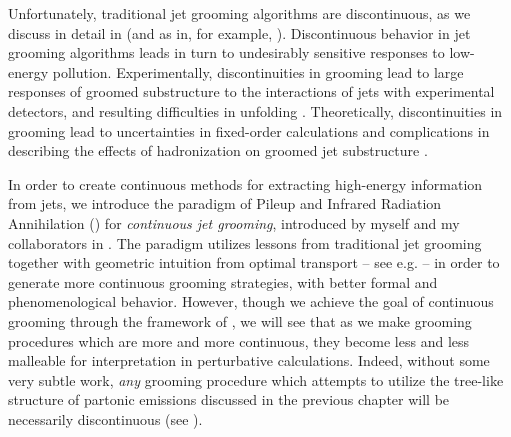 Unfortunately, traditional jet grooming algorithms are discontinuous, as we discuss in detail in  (and as in, for example, ).
%
Discontinuous behavior in jet grooming algorithms leads in turn to undesirably sensitive responses to low-energy pollution.
%
Experimentally, discontinuities in grooming lead to large responses of groomed substructure to the interactions of jets with experimental detectors, and resulting difficulties in unfolding \cite{ATL-PHYS-PUB-2019-027,Aad:2019vyi,ATLAS:2020gwe}.
%
Theoretically, discontinuities in grooming lead to uncertainties in fixed-order calculations \cite{Larkoski:2014wba} and complications in describing the effects of \gls{hadronization} on groomed jet substructure \cite{Hoang:2019ceu}.


In order to create continuous methods for extracting high-energy information from jets, we introduce the paradigm of Pileup and Infrared Radiation Annihilation (\PIRANHA{}) for \emph{continuous jet grooming}, introduced by myself and my collaborators in .
%
The \PIRANHA{} paradigm utilizes lessons from traditional jet grooming together with geometric intuition from optimal transport -- see e.g.  -- in order to generate more continuous grooming strategies, with better formal and phenomenological behavior.
%
However, though we achieve the goal of continuous grooming through the framework of \PIRANHA{}, we will see that as we make grooming procedures which are more and more continuous, they become less and less malleable for interpretation in perturbative calculations.
%
Indeed, without some very subtle work, \textit{any} grooming procedure which attempts to utilize the tree-like structure of partonic emissions discussed in the previous chapter will be necessarily discontinuous (see ).




\begin{table}[t]
    \centering
    

    \caption[Safety and continuity properties of the \PIRANHA{} and Soft Drop grooming algorithms.]{
    Safety and continuity properties of the \PIRANHA{} and Soft Drop grooming algorithms studied in this chapter.
    The mark \cmark~indicates that a groomer satisfies the associated condition, while the mark \xmark~indicates that it does not.
    The mark \raisebox{0.15 em}{\danger} indicates that a groomer does not satisfy the condition, but only in a boundary region of phase space that is exponentially suppressed at leading order in perturbative QCD.
    }
    \label{tab:groomerlist}
\end{table}


